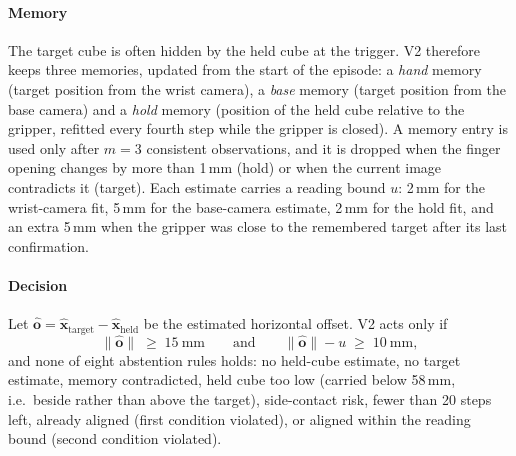\documentclass[preprint,12pt]{elsarticle}
\begin{document}
\paragraph{Memory} The target cube is often hidden by the held cube at the trigger. V2 therefore keeps three memories, updated from the start of the episode: a \emph{hand} memory (target position from the wrist camera), a \emph{base} memory (target position from the base camera) and a \emph{hold} memory (position of the held cube relative to the gripper, refitted every fourth step while the gripper is closed). A memory entry is used only after $m=3$ consistent observations, and it is dropped when the finger opening changes by more than 1\,mm (hold) or when the current image contradicts it (target). Each estimate carries a reading bound $u$: 2\,mm for the wrist-camera fit, 5\,mm for the base-camera estimate, 2\,mm for the hold fit, and an extra 5\,mm when the gripper was close to the remembered target after its last confirmation.

\paragraph{Decision} Let $\hat{\mathbf{o}}=\hat{\mathbf{x}}_{\mathrm{target}}-\hat{\mathbf{x}}_{\mathrm{held}}$ be the estimated horizontal offset. V2 acts only if
\begin{equation}
\|\hat{\mathbf{o}}\| \;\ge\; 15\ \mathrm{mm} \qquad\text{and}\qquad \|\hat{\mathbf{o}}\| - u \;\ge\; 10\ \mathrm{mm},
\end{equation}
and none of eight abstention rules holds: no held-cube estimate, no target estimate, memory contradicted, held cube too low (carried below 58\,mm, i.e.\ beside rather than above the target), side-contact risk, fewer than 20 steps left, already aligned (first condition violated), or aligned within the reading bound (second condition violated).
\end{document}
